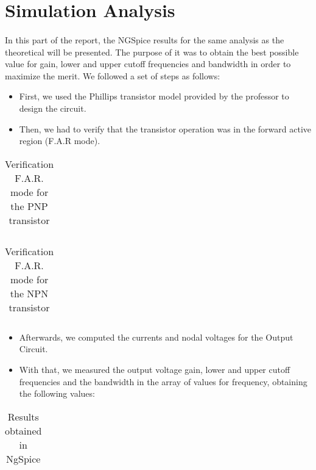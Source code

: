 \newpage{}

\section{Simulation Analysis}
\label{sec:simulation}
\paragraph{}


\par In this part of the report, the NGSpice results for the same analysis as the theoretical will be presented. The purpose of it was to obtain the best possible value for gain, lower and upper cutoff frequencies and bandwidth in order to maximize the merit. We followed a set of steps as follows:
\begin{itemize}
	\item First, we used the Phillips transistor model provided by the professor to design the circuit.
	\item Then, we had to verify that the transistor operation was in the forward active region (F.A.R mode).
\end{itemize}

\begin{table}[H]
  \centering
  \begin{tabular}{|c|c|}
    \hline    
    
  \end{tabular}
  \caption{Verification F.A.R. mode for the PNP transistor}
  \label{sim1}
\end{table}

\begin{table}[H]
  \centering
  \begin{tabular}{|c|c|}
    \hline    
    
  \end{tabular}
  \caption{Verification F.A.R. mode for the NPN transistor}
  \label{sim1}
\end{table}

\begin{itemize}
	\item Afterwards, we computed the currents and nodal voltages for the Output Circuit.
	\item With that, we measured the output voltage gain, lower and upper cutoff frequencies and the bandwidth in the array of values for frequency, obtaining the following values:
\end{itemize}

\begin{table}[H]
  \centering
  \begin{tabular}{|c|c|}
    \hline    
    
  \end{tabular}
  \caption{Results obtained in NgSpice}
  \label{sim1}
\end{table}


